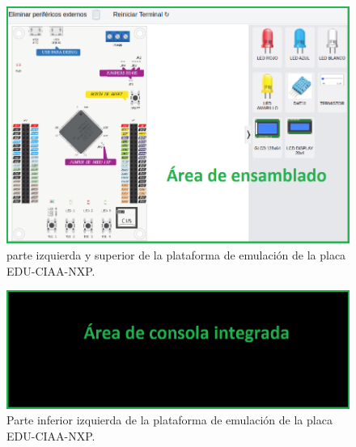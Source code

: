 \begin{figure}[ht]
	\centering
	\includegraphics[scale=.57]{./Figures/PlataformaEmulador1.png}
	\caption{parte izquierda y superior de la plataforma de emulación de la placa EDU-CIAA-NXP.}
	\label{fig:PlataformaEmulador2}
\end{figure}


\begin{figure}[ht]
	\centering
	\includegraphics[scale=.58]{./Figures/PlataformaEmulador2.png}
	\caption{Parte inferior izquierda de la plataforma de emulación de la placa EDU-CIAA-NXP.}
	\label{fig:PlataformaEmulador3}
\end{figure}


\hfill \break
\hfill \break
\hfill \break
\hfill \break
\hfill \break
\hfill \break
\hfill \break
\hfill \break
\hfill \break
\hfill \break
\hfill \break
\hfill \break
\hfill \break

